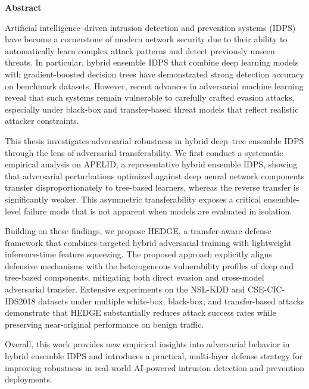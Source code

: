\documentclass[12pt, a4paper, reqno, oneside]{book}
\begin{document}
\vspace{2cm}
{\bf Abstract}
\vspace{5pt}

Artificial intelligence–driven intrusion detection and prevention systems (IDPS) have become a cornerstone of modern network security due to their ability to automatically learn complex attack patterns and detect previously unseen threats. In particular, hybrid ensemble IDPS that combine deep learning models with gradient-boosted decision trees have demonstrated strong detection accuracy on benchmark datasets. However, recent advances in adversarial machine learning reveal that such systems remain vulnerable to carefully crafted evasion attacks, especially under black-box and transfer-based threat models that reflect realistic attacker constraints.

This thesis investigates adversarial robustness in hybrid deep–tree ensemble IDPS through the lens of adversarial transferability. We first conduct a systematic empirical analysis on APELID, a representative hybrid ensemble IDPS, showing that adversarial perturbations optimized against deep neural network components transfer disproportionately to tree-based learners, whereas the reverse transfer is significantly weaker. This asymmetric transferability exposes a critical ensemble-level failure mode that is not apparent when models are evaluated in isolation.

Building on these findings, we propose HEDGE, a transfer-aware defense framework that combines targeted hybrid adversarial training with lightweight inference-time feature squeezing. The proposed approach explicitly aligns defensive mechanisms with the heterogeneous vulnerability profiles of deep and tree-based components, mitigating both direct evasion and cross-model adversarial transfer. Extensive experiments on the NSL-KDD and CSE-CIC-IDS2018 datasets under multiple white-box, black-box, and transfer-based attacks demonstrate that HEDGE substantially reduces attack success rates while preserving near-original performance on benign traffic.

Overall, this work provides new empirical insights into adversarial behavior in hybrid ensemble IDPS and introduces a practical, multi-layer defense strategy for improving robustness in real-world AI-powered intrusion detection and prevention deployments.




\newpage
\tableofcontents

\newpage
\listoffigures
 
\end{document}
